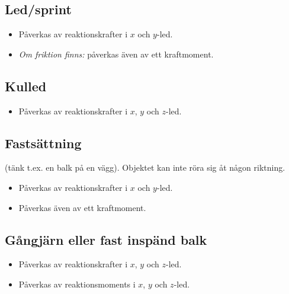 \documentclass{article}
\newenvironment{ankiflashcard}[1]{}{}
\begin{document}
\begin{paracol}{2}
\begin{ankiflashcard}{Vilka reaktionskrafter påverkas en led/en sprint av}
\subsection{Led/sprint}
\begin{itemize}
    \item Påverkas av reaktionskrafter i $x$ och $y$-led.
    \item \textit{Om friktion finns:} påverkas även av ett kraftmoment.
\end{itemize}
\end{ankiflashcard}

\begin{ankiflashcard}{Vilka reaktionskrafter påverkas en kulled av?}
    
\subsection{Kulled}

\begin{itemize}
    \item Påverkas av reaktionskrafter i $x$, $y$ och $z$-led.
\end{itemize}
\end{ankiflashcard}

\begin{ankiflashcard}{Vilka reaktionskrafter påverkas ett fastsatt objekt av?}
\subsection{Fastsättning}
(tänk t.ex. en balk på en vägg). Objektet kan inte röra sig åt någon riktning.
\begin{itemize}
    \item Påverkas av reaktionskrafter i $x$ och $y$-led.
    \item Påverkas även av ett kraftmoment.
\end{itemize}
\end{ankiflashcard}

\begin{ankiflashcard}{Vilka reaktionskrafter påverkas ett gångjärn av?}
    
\subsection{Gångjärn eller fast inspänd balk}
\begin{itemize}
    \item Påverkas av reaktionskrafter i $x$, $y$ och $z$-led.
    \item Påverkas av reaktionsmoments i $x$, $y$ och $z$-led.
\end{itemize}
\end{ankiflashcard}
\end{paracol}
\end{document}
